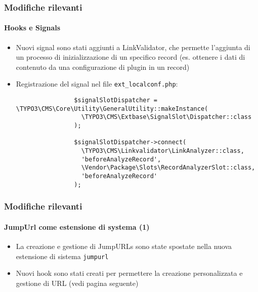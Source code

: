 \begin{frame}[fragile]
	\frametitle{Modifiche rilevanti}
	\framesubtitle{Hooks e Signals}

	\lstset{basicstyle=\tiny\ttfamily}

	\begin{itemize}

		\item Nuovi signal sono stati aggiunti a LinkValidator, che permette l'aggiunta di
			un processo di inizializzazione di un specifico record\newline
			\small
				(es. ottenere i dati di contenuto da una configurazione di plugin in un record)
			\normalsize

		\item Registrazione del signal nel file \texttt{ext\_localconf.php}:

			\begin{lstlisting}
				$signalSlotDispatcher = \TYPO3\CMS\Core\Utility\GeneralUtility::makeInstance(
				  \TYPO3\CMS\Extbase\SignalSlot\Dispatcher::class
				);

				$signalSlotDispatcher->connect(
				  \TYPO3\CMS\Linkvalidator\LinkAnalyzer::class,
				  'beforeAnalyzeRecord',
				  \Vendor\Package\Slots\RecordAnalyzerSlot::class,
				  'beforeAnalyzeRecord'
				);
			\end{lstlisting}

	\end{itemize}

\end{frame}


\begin{frame}[fragile]
	\frametitle{Modifiche rilevanti}
	\framesubtitle{JumpUrl come estensione di systema (1)}

	\lstset{basicstyle=\tiny\ttfamily}

	\begin{itemize}

		\item La creazione e gestione di JumpURLs sono state spostate nella nuova estensione di sistema \texttt{jumpurl}

		\item Nuovi hook sono stati creati per permettere la creazione personalizzata e gestione di URL (vedi pagina seguente)

	\end{itemize}

	\breakingchange

\end{frame}

